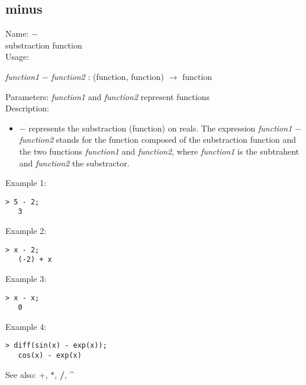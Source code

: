 \subsection{ minus }
\noindent Name: \textbf{$-$}\\
substraction function\\

\noindent Usage: 
\begin{center}
\emph{function1} \textbf{$-$} \emph{function2} : (\textsf{function}, \textsf{function}) $\rightarrow$ \textsf{function}\\
\end{center}
Parameters: 
\emph{function1} and \emph{function2} represent functions\\

\noindent Description: \begin{itemize}

\item \textbf{$-$} represents the substraction (function) on reals. 
   The expression \emph{function1} \textbf{$-$} \emph{function2} stands for
   the function composed of the substraction function and the two
   functions \emph{function1} and \emph{function2}, where \emph{function1} is 
   the subtrahent and \emph{function2} the substractor.
\end{itemize}
\noindent Example 1: 
\begin{center}\begin{minipage}{14.8cm}\begin{Verbatim}[frame=single]
   > 5 - 2;
   3
\end{Verbatim}
\end{minipage}\end{center}
\noindent Example 2: 
\begin{center}\begin{minipage}{14.8cm}\begin{Verbatim}[frame=single]
   > x - 2;
   (-2) + x
\end{Verbatim}
\end{minipage}\end{center}
\noindent Example 3: 
\begin{center}\begin{minipage}{14.8cm}\begin{Verbatim}[frame=single]
   > x - x;
   0
\end{Verbatim}
\end{minipage}\end{center}
\noindent Example 4: 
\begin{center}\begin{minipage}{14.8cm}\begin{Verbatim}[frame=single]
   > diff(sin(x) - exp(x));
   cos(x) - exp(x)
\end{Verbatim}
\end{minipage}\end{center}
See also: \textbf{$+$}, \textbf{$*$}, \textbf{/}, \textbf{\^}
